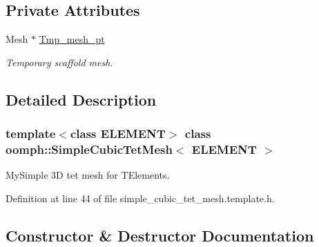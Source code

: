 \subsection*{Private Attributes}
\begin{DoxyCompactItemize}
\item 
Mesh $\ast$ \hyperlink{classoomph_1_1SimpleCubicTetMesh_a125fc9ec4d3d74e147ac7f17f867e1a3}{Tmp\+\_\+mesh\+\_\+pt}
\begin{DoxyCompactList}\small\item\em Temporary scaffold mesh. \end{DoxyCompactList}\end{DoxyCompactItemize}


\subsection{Detailed Description}
\subsubsection*{template$<$class E\+L\+E\+M\+E\+NT$>$\newline
class oomph\+::\+Simple\+Cubic\+Tet\+Mesh$<$ E\+L\+E\+M\+E\+N\+T $>$}

My\+Simple 3D tet mesh for T\+Elements. 

Definition at line 44 of file simple\+\_\+cubic\+\_\+tet\+\_\+mesh.\+template.\+h.



\subsection{Constructor \& Destructor Documentation}
\mbox{\label{classoomph_1_1SimpleCubicTetMesh_a636c5d124ede05ff29abdcf7fdd08391}} 
